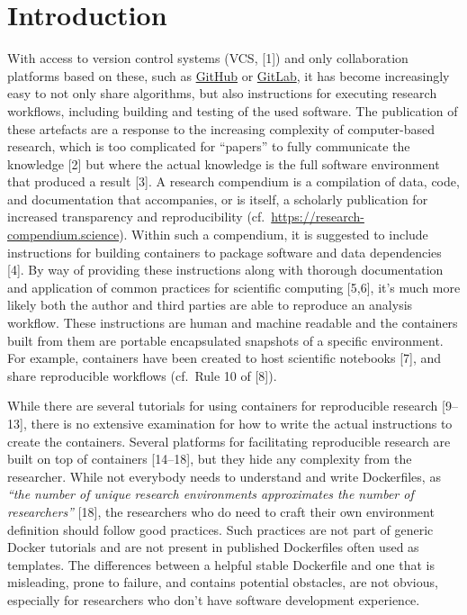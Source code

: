 \documentclass[10pt,letterpaper]{article}
\begin{document}
\linenumbers

\hypertarget{introduction}{%
\section*{Introduction}\label{introduction}}

With access to version control systems (VCS, {[}1{]}) and only
collaboration platforms based on these, such as
\href{https://github.com}{GitHub} or \href{https://gitlab.com}{GitLab},
it has become increasingly easy to not only share algorithms, but also
instructions for executing research workflows, including building and
testing of the used software. The publication of these artefacts are a
response to the increasing complexity of computer-based research, which
is too complicated for ``papers'' to fully communicate the knowledge
{[}2{]} but where the actual knowledge is the full software environment
that produced a result {[}3{]}. A research compendium is a compilation
of data, code, and documentation that accompanies, or is itself, a
scholarly publication for increased transparency and reproducibility
(cf.~\url{https://research-compendium.science}). Within such a
compendium, it is suggested to include instructions for building
containers to package software and data dependencies {[}4{]}. By way of
providing these instructions along with thorough documentation and
application of common practices for scientific computing {[}5,6{]}, it's
much more likely both the author and third parties are able to reproduce
an analysis workflow. These instructions are human and machine readable
and the containers built from them are portable encapsulated snapshots
of a specific environment. For example, containers have been created to
host scientific notebooks {[}7{]}, and share reproducible workflows
(cf.~Rule 10 of {[}8{]}).

While there are several tutorials for using containers for reproducible
research {[}9--13{]}, there is no extensive examination for how to write
the actual instructions to create the containers. Several platforms for
facilitating reproducible research are built on top of containers
{[}14--18{]}, but they hide any complexity from the researcher. While
not everybody needs to understand and write Dockerfiles, as \emph{``the
number of unique research environments approximates the number of
researchers''} {[}18{]}, the researchers who do need to craft their own
environment definition should follow good practices. Such practices are
not part of generic Docker tutorials and are not present in published
Dockerfiles often used as templates. The differences between a helpful
stable Dockerfile and one that is misleading, prone to failure, and
contains potential obstacles, are not obvious, especially for
researchers who don't have software development experience.
\end{document}
